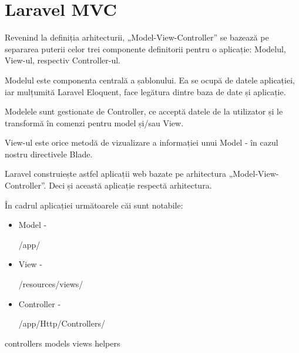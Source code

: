 \section{Laravel MVC}

	Revenind la definiția arhitecturii, „Model-View-Controller” se bazează pe separarea puterii celor trei componente definitorii pentru o aplicație: Modelul, View-ul, respectiv Controller-ul.\cite{poo_sa}

	Modelul este componenta centrală a șablonului.
	Ea se ocupă de datele aplicației, iar mulțumită Laravel Eloquent, face legătura dintre baza de date și aplicație.

	Modelele sunt gestionate de Controller, ce acceptă datele de la utilizator și le transformă în comenzi pentru model și/sau View.

	View-ul este orice metodă de vizualizare a informației unui Model -  în cazul nostru directivele Blade.

	Laravel construiește astfel aplicații web bazate pe arhitectura „Model-View-Controller”.
	Deci și această aplicație respectă arhitectura.

	În cadrul aplicației următoarele căi sunt notabile:
	\begin{itemize}
		\item Model - \begin{verb} /app/ \end{verb}
		\item View - \begin{verb} /resources/views/ \end{verb}
		\item Controller - \begin{verb} /app/Http/Controllers/ \end{verb}
	\end{itemize}

	{controllers}
	{models}
	{views}
	{helpers}
